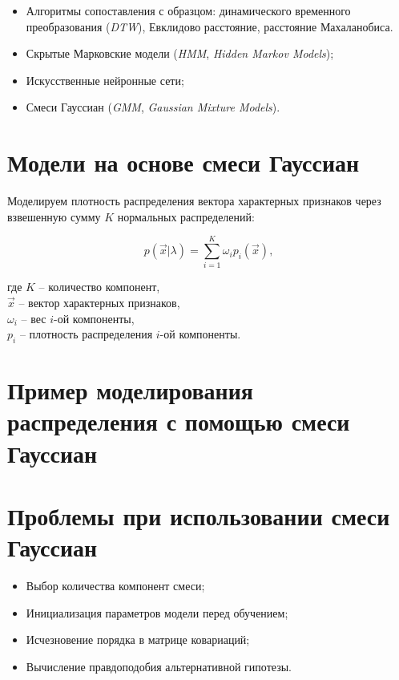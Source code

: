 \documentclass[12pt]{article}
\begin{document}
\begin{itemize}
\item Алгоритмы сопоставления с образцом: динамического временного преобразования (\emph{DTW}), Евклидово расстояние, расстояние Махаланобиса.
\item Скрытые Марковские модели (\emph{HMM}, \emph{Hidden Markov Models});
\item Искусственные нейронные сети;
\item Смеси Гауссиан (\emph{GMM}, \emph{Gaussian Mixture Models}).
\end{itemize}

\section{Модели на основе смеси Гауссиан}

Моделируем плотность распределения вектора характерных признаков через взвешенную сумму $K$ нормальных распределений:

\begin{equation}
p(\vec x | \lambda) = \sum_{i=1}^K{\omega_i p_i(\vec x)},
\end{equation}

\noindent где $K$ -- количество компонент,\\
$\vec x$ -- вектор характерных признаков,\\
$\omega_i$ -- вес $i$-ой компоненты, \\
$p_i$ -- плотность распределения $i$-ой компоненты.

\section{Пример моделирования распределения с помощью смеси Гауссиан}

\begin{figure}[h!]
\end{figure}

\section{Проблемы при использовании смеси Гауссиан}

\begin{itemize}
\item Выбор количества компонент смеси;
\item Инициализация параметров модели перед обучением;
\item Исчезновение порядка в матрице ковариаций;
\item Вычисление правдоподобия альтернативной гипотезы.
\end{itemize}
\end{document}

